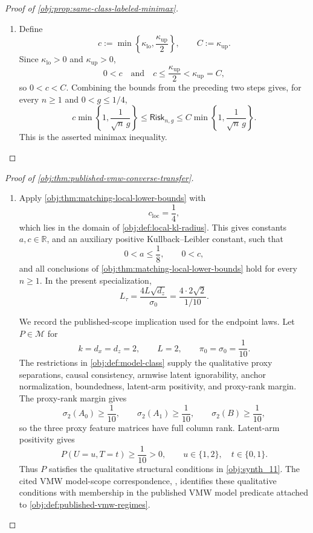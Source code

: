\documentclass[11pt]{article}
\begin{document}
\begin{proof}[Proof of \cref{obj:prop:same-class-labeled-minimax}]
\begin{enumerate}
\item Define
\[
c:=\min\left\{\kappa_{\mathrm{lo}},\frac{\kappa_{\mathrm{up}}}{2}\right\},
\qquad
C:=\kappa_{\mathrm{up}}.
\]
Since \(\kappa_{\mathrm{lo}}>0\) and \(\kappa_{\mathrm{up}}>0\),
\[
0<c
\quad\text{and}\quad
c\le\frac{\kappa_{\mathrm{up}}}{2}<\kappa_{\mathrm{up}}=C,
\]
so \(0<c<C\). Combining the bounds from the preceding two steps gives, for every \(n\ge1\) and \(0<g\le1/4\),
\[
c\min\left\{1,\frac{1}{\sqrt n\,g}\right\}
\le
\mathsf{Risk}_{n,g}
\le
C\min\left\{1,\frac{1}{\sqrt n\,g}\right\}.
\]
This is the asserted minimax inequality.
\end{enumerate}
\end{proof}

\begin{proof}[Proof of \cref{obj:thm:published-vmw-converse-transfer}]
\begin{enumerate}
\item Apply \cref{obj:thm:matching-local-lower-bounds} with
\[
c_{\mathrm{loc}}=\frac14,
\]
which lies in the domain of \cref{obj:def:local-kl-radius}.  This gives constants \(a,c\in\mathbb R\), and an auxiliary positive Kullback--Leibler constant, such that
\[
0<a\le \frac18,
\qquad
0<c,
\]
and all conclusions of \cref{obj:thm:matching-local-lower-bounds} hold for every \(n\ge1\).  In the present specialization,
\[
L_\tau
=\frac{4L\sqrt{d_z}}{\sigma_0}
=\frac{4\cdot2\sqrt2}{1/10}.
\]

We record the published-scope implication used for the endpoint laws.  Let \(P\in\mathcal M\) for
\[
k=d_x=d_z=2,\qquad L=2,\qquad \pi_0=\sigma_0=\frac1{10}.
\]
The restrictions in \cref{obj:def:model-class} supply the qualitative proxy separations, causal consistency, armwise latent ignorability, anchor normalization, boundedness, latent-arm positivity, and proxy-rank margin.  The proxy-rank margin gives
\[
\sigma_2(A_0)\ge \frac1{10},
\qquad
\sigma_2(A_1)\ge \frac1{10},
\qquad
\sigma_2(B)\ge \frac1{10},
\]
so the three proxy feature matrices have full column rank.  Latent-arm positivity gives
\[
P(U=u,T=t)\ge \frac1{10}>0,
\qquad
u\in\{1,2\},\quad t\in\{0,1\}.
\]
Thus \(P\) satisfies the qualitative structural conditions in \cref{obj:synth_11}.  The cited VMW model-scope correspondence, \citep[Assumptions 1--2 and Section 4.2]{VirkMazaheriWu2026}, identifies these qualitative conditions with membership in the published VMW model predicate attached to \cref{obj:def:published-vmw-regimes}.


\end{enumerate}
\end{proof}
\end{document}
